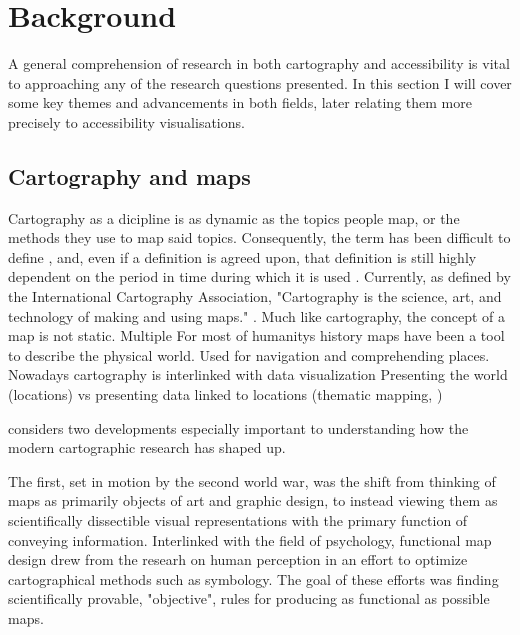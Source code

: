\documentclass[12pt]{article}
\begin{document}
\section{Background}
A general comprehension of research in both cartography and accessibility is
vital to approaching any of the research questions presented.
In this section I will cover some key themes and advancements in both fields, %
later relating them more precisely to accessibility visualisations.


\subsection{Cartography and maps}

Cartography as a dicipline is as dynamic as the topics people map,
or the methods they use to map said topics.
Consequently, the term has been difficult to define \parencite{kry1995},
and, even if a definition is agreed upon,
that definition is still highly dependent on the period in time
during which it is used \parencite{tyn1992}.
Currently, as defined by the International Cartography Association, "Cartography is
the science, art, and technology of making and using maps."
\parencite{ica2019}.
Much like cartography, the concept of a map is not static.
Multiple 
For most of humanitys history maps have been a tool to describe the physical world.
Used for navigation and comprehending places.
Nowadays cartography is interlinked with data visualization
Presenting the world (locations) vs presenting data linked to locations (thematic mapping, \parencite{tyn1992})

\textcite{mac2004} considers two developments especially important
to understanding how the modern cartographic research has shaped up.

The first, set in motion by the second world war, was
the shift from thinking of maps as primarily objects of art and graphic design,
to instead viewing them as scientifically dissectible visual representations
with the primary function of conveying information.
Interlinked with the field of psychology,
functional map design drew from the researh on human perception
in an effort to optimize cartographical methods such as symbology.
The goal of these efforts was finding scientifically provable, "objective", rules
for producing as functional as possible maps.
\end{document}
